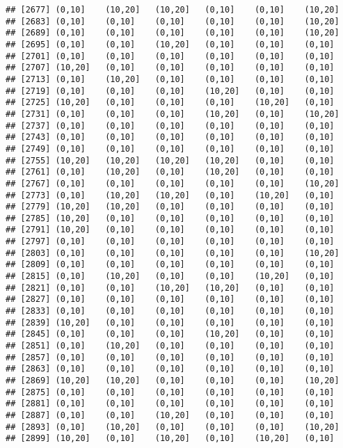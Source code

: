 \documentclass[]{article}
\begin{document}
\begin{verbatim}
## [2677] (0,10]    (10,20]   (10,20]   (0,10]    (0,10]    (10,20]  
## [2683] (0,10]    (0,10]    (0,10]    (0,10]    (0,10]    (10,20]  
## [2689] (0,10]    (0,10]    (0,10]    (0,10]    (0,10]    (10,20]  
## [2695] (0,10]    (0,10]    (10,20]   (0,10]    (0,10]    (0,10]   
## [2701] (0,10]    (0,10]    (0,10]    (0,10]    (0,10]    (0,10]   
## [2707] (10,20]   (0,10]    (0,10]    (0,10]    (0,10]    (0,10]   
## [2713] (0,10]    (10,20]   (0,10]    (0,10]    (0,10]    (0,10]   
## [2719] (0,10]    (0,10]    (0,10]    (10,20]   (0,10]    (0,10]   
## [2725] (10,20]   (0,10]    (0,10]    (0,10]    (10,20]   (0,10]   
## [2731] (0,10]    (0,10]    (0,10]    (10,20]   (0,10]    (10,20]  
## [2737] (0,10]    (0,10]    (0,10]    (0,10]    (0,10]    (0,10]   
## [2743] (0,10]    (0,10]    (0,10]    (0,10]    (0,10]    (0,10]   
## [2749] (0,10]    (0,10]    (0,10]    (0,10]    (0,10]    (0,10]   
## [2755] (10,20]   (10,20]   (10,20]   (10,20]   (0,10]    (0,10]   
## [2761] (0,10]    (10,20]   (0,10]    (10,20]   (0,10]    (0,10]   
## [2767] (0,10]    (0,10]    (0,10]    (0,10]    (0,10]    (10,20]  
## [2773] (0,10]    (10,20]   (10,20]   (0,10]    (10,20]   (0,10]   
## [2779] (10,20]   (10,20]   (0,10]    (0,10]    (0,10]    (0,10]   
## [2785] (10,20]   (0,10]    (0,10]    (0,10]    (0,10]    (0,10]   
## [2791] (10,20]   (0,10]    (0,10]    (0,10]    (0,10]    (0,10]   
## [2797] (0,10]    (0,10]    (0,10]    (0,10]    (0,10]    (0,10]   
## [2803] (0,10]    (0,10]    (0,10]    (0,10]    (0,10]    (10,20]  
## [2809] (0,10]    (0,10]    (0,10]    (0,10]    (0,10]    (0,10]   
## [2815] (0,10]    (10,20]   (0,10]    (0,10]    (10,20]   (0,10]   
## [2821] (0,10]    (0,10]    (10,20]   (10,20]   (0,10]    (0,10]   
## [2827] (0,10]    (0,10]    (0,10]    (0,10]    (0,10]    (0,10]   
## [2833] (0,10]    (0,10]    (0,10]    (0,10]    (0,10]    (0,10]   
## [2839] (10,20]   (0,10]    (0,10]    (0,10]    (0,10]    (0,10]   
## [2845] (0,10]    (0,10]    (0,10]    (10,20]   (0,10]    (0,10]   
## [2851] (0,10]    (10,20]   (0,10]    (0,10]    (0,10]    (0,10]   
## [2857] (0,10]    (0,10]    (0,10]    (0,10]    (0,10]    (0,10]   
## [2863] (0,10]    (0,10]    (0,10]    (0,10]    (0,10]    (0,10]   
## [2869] (10,20]   (10,20]   (0,10]    (0,10]    (0,10]    (10,20]  
## [2875] (0,10]    (0,10]    (0,10]    (0,10]    (0,10]    (0,10]   
## [2881] (0,10]    (0,10]    (0,10]    (0,10]    (0,10]    (0,10]   
## [2887] (0,10]    (0,10]    (10,20]   (0,10]    (0,10]    (0,10]   
## [2893] (0,10]    (10,20]   (0,10]    (0,10]    (0,10]    (10,20]  
## [2899] (10,20]   (0,10]    (10,20]   (0,10]    (10,20]   (0,10]   

\end{verbatim}
\end{document}
